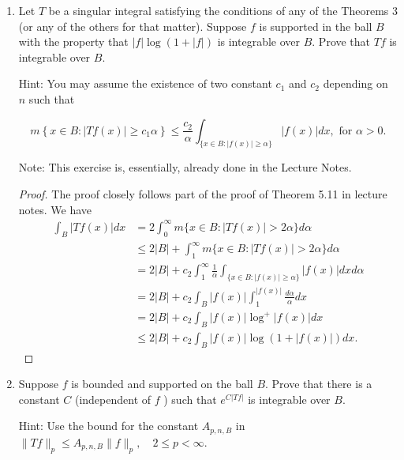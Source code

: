 \begin{enumerate}
\item 
	Let $T$ be a singular integral satisfying the conditions of any of the Theorems 3 (or any of the others for that matter). Suppose $f$ is supported in the ball $B$ with the property that $|f| \log (1+|f|)$ is integrable over $B$. Prove that $T f$ is integrable over $B$.

Hint: You may assume the existence of two constant $c_1$ and $c_2$ depending on $n$ such that

\[
m\left\{x \in B:|T f(x)| \geq c_1 \alpha\right\} \leq \frac{c_2}{\alpha} \int_{\{x \in B:|f(x)| \geq \alpha\}}|f(x)| d x, \text { for } \alpha>0 .
\]


Note: This exercise is, essentially, already done in the Lecture Notes.

\begin{proof}
	The proof closely follows part of the proof of Theorem 5.11 in lecture notes. We have
	\begin{align*}
		\int _B |T f(x)| d x
		&= 2 \int _0^\infty m \{x \in B: |T f(x)| > 2 \alpha\}  d \alpha \\
		&\leq 2|B| + \int _1^\infty m \{x \in B: |T f(x)| > 2 \alpha\}  d \alpha \\
		&= 2|B| + c_2 \int _1^\infty \frac{1}{\alpha} \int_{\{x \in B:|f(x)| \geq \alpha\}}|f(x)| d x  d \alpha \\
		&= 2|B| + c_2 \int_{B} |f(x)| \int _1^{|f(x)|} \frac{d \alpha}{\alpha} d x \\
		&= 2 |B| + c_2 \int _B |f(x)| \log^+ |f(x)| d x \\
		&\leq 2 |B| + c_2 \int _B |f(x)| \log (1  + |f(x)|) d x
	.\end{align*}
\end{proof}

\item 
	Suppose $f$ is bounded and supported on the ball $B$. Prove that there is a constant $C$ (independent of $f$ ) such that $e^{C|T f|}$ is integrable over $B$.

Hint: Use the bound for the constant $A_{p, n, B}$ in $\|T f\|_p \leq A_{p, n, B}\|f\|_p, \quad 2 \leq p<\infty$.


\end{enumerate}
